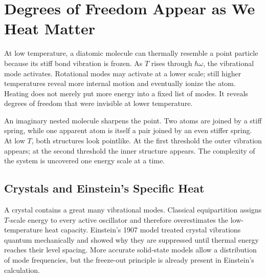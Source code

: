 \section{Degrees of Freedom Appear as We Heat Matter}

At low temperature, a diatomic molecule can thermally resemble a point
particle because its stiff bond vibration is frozen.  As \(T\) rises through
\(\hbar\omega\), the vibrational mode activates.  Rotational modes may
activate at a lower scale; still higher temperatures reveal more internal
motion and eventually ionize the atom.  Heating does not merely put more
energy into a fixed list of modes.  It reveals degrees of freedom that were
invisible at lower temperature.

An imaginary nested molecule sharpens the point.  Two atoms are
joined by a stiff spring, while one apparent atom is itself a pair joined by
an even stiffer spring.  At low \(T\), both structures look pointlike.  At the
first threshold the outer vibration appears; at the second threshold the
inner structure appears.  The complexity of the system is uncovered one
energy scale at a time.

\begin{classroomqa}
\end{classroomqa}

\subsection{Crystals and Einstein's Specific Heat}

A crystal contains a great many vibrational modes.  Classical equipartition
assigns \(T\)-scale energy to every active oscillator and therefore
overestimates the low-temperature heat capacity.  Einstein's 1907 model
treated crystal vibrations quantum mechanically and showed why they are
suppressed until thermal energy reaches their level spacing.  More accurate
solid-state models allow a distribution of mode frequencies, but the
freeze-out principle is already present in Einstein's calculation.

